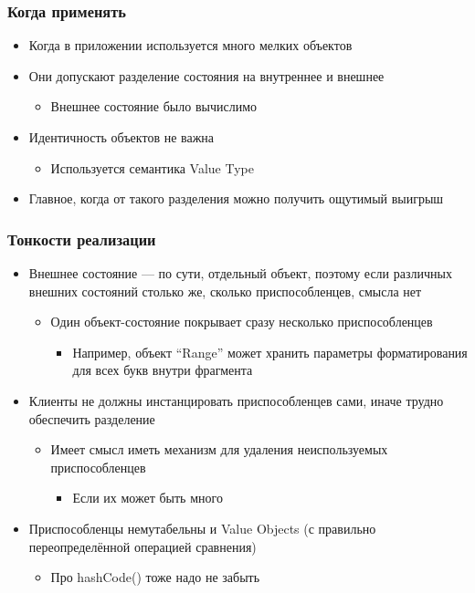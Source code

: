 \documentclass{../../slides-style}
\begin{document}
    \begin{frame}
        \frametitle{Когда применять}
        \begin{itemize}
            \item Когда в приложении используется много мелких объектов
            \item Они допускают разделение состояния на внутреннее и внешнее
            \begin{itemize}
                \item Внешнее состояние было вычислимо
            \end{itemize}
            \item Идентичность объектов не важна
            \begin{itemize}
                \item Используется семантика Value Type
            \end{itemize}
            \item Главное, когда от такого разделения можно получить ощутимый выигрыш
        \end{itemize}
    \end{frame}

    \begin{frame}
        \frametitle{Тонкости реализации}
        \begin{itemize}
            \item Внешнее состояние --- по сути, отдельный объект, поэтому если различных внешних состояний столько же, сколько приспособленцев, смысла нет
            \begin{itemize}
                \item Один объект-состояние покрывает сразу несколько приспособленцев
                \begin{itemize}
                    \item Например, объект ``Range'' может хранить параметры форматирования для всех букв внутри фрагмента
                \end{itemize}
            \end{itemize}
            \item Клиенты не должны инстанцировать приспособленцев сами, иначе трудно обеспечить разделение
            \begin{itemize}
                \item Имеет смысл иметь механизм для удаления неиспользуемых приспособленцев
                \begin{itemize}
                    \item Если их может быть много
                \end{itemize}
            \end{itemize}
            \item Приспособленцы немутабельны и Value Objects (с правильно переопределённой операцией сравнения)
            \begin{itemize}
                \item Про hashCode() тоже надо не забыть
            \end{itemize}
        \end{itemize}
    \end{frame}
\end{document}
